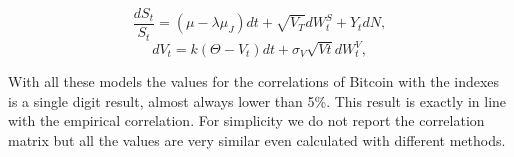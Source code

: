 \begin{equation}
  \frac{dS_t}{S_t} = \left( \mu - \lambda \mu_J\right) dt + \sqrt{V_T}dW_t^S + Y_t dN  ,
\end{equation}
\begin{equation}
  dV_t = k\left(\Theta - V_t \right) dt + \sigma _V \sqrt{Vt}dW_t^V ,
\end{equation}
\begin{table}[H]
    \caption{Correlations under Bates model, source: \citep{samuele}}
\end{table}
\bigskip


With all these models the values for the correlations of Bitcoin with the indexes is a single digit result, almost always lower than 5\%. This result is exactly in line with the empirical correlation. For simplicity we do not report the correlation matrix but all the values are very similar even calculated with different methods.

